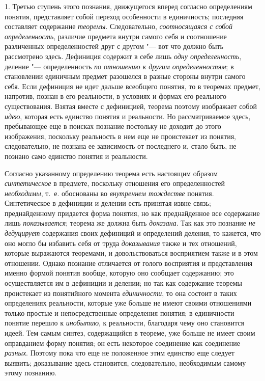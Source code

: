 1. Третью ступень этого познания, движущегося вперед согласно
определениям понятия, представляет собой переход особенности в единичность;
последняя составляет содержание
{\em теоремы}.
Следовательно,
{\em соотносящаяся с собой
определенность}, различие предмета внутри самого себя и
соотношение различенных определенностей друг с другом "--- вот
что должно быть рассмотрено здесь. Дефиниция содержит в себе лишь
{\em одну определенность},
деление "--- определенность
{\em по отношению к другим
определенностям}; в становлении единичным предмет разошелся
в разные стороны внутри самого себя. Если дефиниция не идет дальше
всеобщего понятия, то в теоремах предмет, напротив, познан в его
реальности, в условиях и формах его реального существования. Взятая вместе
с дефиницией, теорема поэтому изображает собой
{\em идею}, которая есть
единство понятия и реальности. Но рассматриваемое здесь, пребывающее еще в
поисках познание постольку не доходит до этого изображения, поскольку
реальность в нем еще не проистекает из понятия, следовательно, не познана
ее зависимость от последнего и, стало быть, не познано само единство
понятия и реальности.

Согласно указанному определению теорема есть настоящим образом
{\em синтетическое} в
предмете, поскольку отношения его определенностей
{\em необходимы}, т.~е.
обоснованы во {\em внутреннем
тождестве} понятия. Синтетическое в дефиниции и делении есть
принятая извне связь; преднайденному придается форма понятия, но как
преднайденное все содержание лишь
{\em показывается};
теорема же должна быть
{\em доказана}. Так как
это познание {\em не дедуцирует}
содержания своих дефиниций и определений деления, то кажется,
что оно могло бы избавить себя от труда
{\em доказывания} также и
тех отношений, которые выражаются теоремами, и довольствоваться восприятием
также и в этом отношении. Однако познание отличается от голого восприятия и
представления именно формой понятия вообще, которую оно сообщает
содержанию; это осуществляется им в дефиниции и делении; но так как
содержание теоремы проистекает из понятийного момента
{\em единичности}, то она
состоит в таких определениях реальности, которые уже больше не имеют своими
отношениями только простые и непосредственные определения понятия; в
единичности понятие перешло к
{\em инобытию}, к
реальности, благодаря чему оно становится идеей. Тем самым синтез,
содержащийся в теореме, уже больше не имеет своим оправданием форму
понятия; он есть некоторое соединение как соединение
{\em разных}. Поэтому
пока что еще не положенное этим единство еще следует выявить; доказывание
здесь становится, следовательно, необходимым самому этому познанию.

